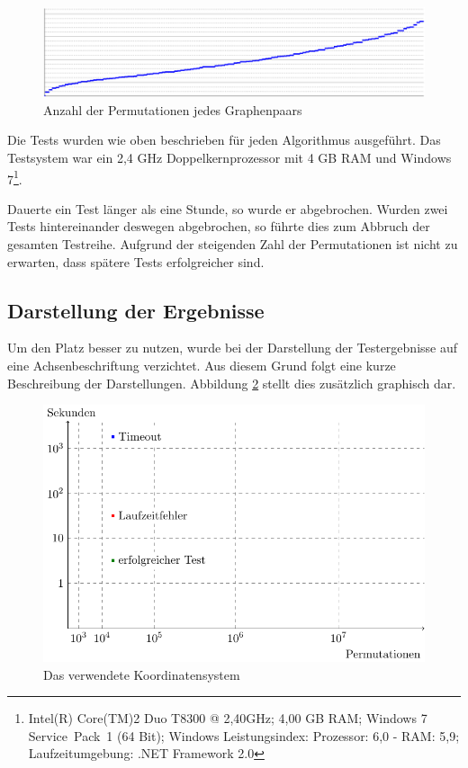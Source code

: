 \begin{figure}[htb]
\centering
\includegraphics[width=\linewidth,height=\textheight,
keepaspectratio]{bilder/PermSize}
\caption{Anzahl der Permutationen jedes Graphenpaars}
\label{pic:PermSize}
\end{figure}

Die Tests wurden wie oben beschrieben für jeden Algorithmus ausgeführt. Das Testsystem 
war ein 2,4 GHz Doppelkernprozessor mit 4 GB RAM und Windows 7\footnote{Intel(R) Core(TM)2 
Duo T8300 @ 2,40GHz; 4,00 GB RAM; Windows 7 Service~Pack~1 (64 Bit); Windows 
Leistungsindex: Prozessor: 6,0 - RAM: 5,9; Laufzeitumgebung: .NET Framework 2.0}. 

Dauerte ein Test länger als eine Stunde, so wurde er abgebrochen. Wurden zwei Tests 
hintereinander deswegen abgebrochen, so führte dies zum Abbruch der gesamten Testreihe. 
Aufgrund der steigenden Zahl der Permutationen ist nicht zu erwarten, dass spätere Tests 
erfolgreicher sind. 

\subsection{Darstellung der Ergebnisse}
Um den Platz besser zu nutzen, wurde bei der Darstellung der Testergebnisse auf eine 
Achsenbeschriftung verzichtet. Aus diesem Grund folgt eine kurze Beschreibung der 
Darstellungen. Abbildung \ref{pic:cordExplain} stellt dies zusätzlich graphisch dar. 

\begin{figure}[htb]
\centering
\includegraphics[width=\linewidth,height=\textheight,keepaspectratio]{bilder/empty.pdf}
\caption{Das verwendete Koordinatensystem}
\label{pic:cordExplain}
\end{figure}

